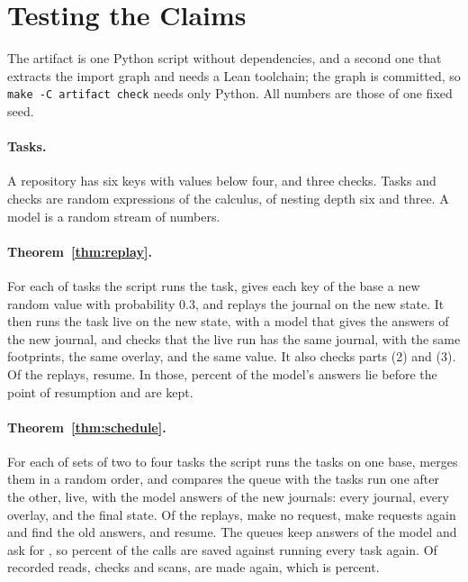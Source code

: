 \documentclass[acmsmall,nonacm,screen]{acmart}
\begin{document}
\section{Testing the Claims}
\label{sec:tests}

The artifact is one Python script without dependencies, and a second one that extracts the
import graph and needs a Lean toolchain; the graph is committed, so
\texttt{make -C artifact check} needs only Python. All numbers are those of one fixed seed.

\paragraph{Tasks.} A repository has six keys with values below four, and three checks. Tasks
and checks are random expressions of the calculus, of nesting depth six and three. A model
is a random stream of numbers.

\paragraph{Theorem~\ref{thm:replay}.} For each of \exRebases{} tasks the script runs the
task, gives each key of the base a new random value with probability $0.3$, and replays the
journal on the new state. It then runs the task live on the new state, with a model that gives the answers
of the new journal, and checks that the live run has the same journal, with the same
footprints, the same overlay, and the same value. It also checks parts (2) and (3). Of the
replays, \exRebaseResumed{} resume. In those, \exResumedKeptPercent{} percent of the
model's answers lie before the point of resumption and are kept.

\paragraph{Theorem~\ref{thm:schedule}.} For each of \exQueues{} sets of two to four tasks
the script runs the tasks on one base, merges them in a random order, and compares the
queue with the tasks run one after the other, live, with the model answers of the new
journals: every journal, every overlay, and the final state. Of the \exQueueTasks{}
replays, \exUntouched{} make no request, \exCompared{} make requests again and find the old
answers, and \exResumed{} resume. The queues keep \exQueueSaved{} answers of the model and
ask for \exQueueCalls{}, so \exSavedPercent{} percent of the calls are saved against running
every task again. Of \exEntries{} recorded reads, checks and scans, \exRepeated{} are made
again, which is \exRepeatedPercent{} percent.
\end{document}
